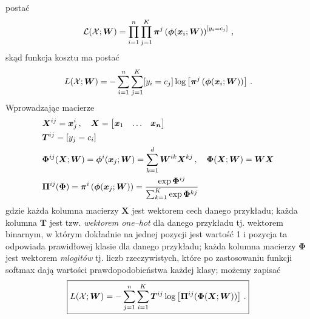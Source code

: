 \documentclass{myclass}
\numberwithin{equation}{subsection}
\begin{document}
postać
\begin{equation}
    \mathcal{L}(\mathcal{X}; \bm{W}) = \prod_{i=1}^n \prod_{j=1}^K \bm{\pi}^j\left(\bm{\phi}(\bm{x}_i; \bm{W})\right)^{[y_i = c_j]}\,,
\end{equation}
skąd funkcja kosztu ma postać
\begin{equation}
    L(\mathcal{X}; \bm{W}) = - \sum_{i=1}^n \sum_{j=1}^K [y_i = c_j] \log \left[ \bm{\pi}^j\left(\bm{\phi}(\bm{x}_i; \bm{W})\right)\right]\,.
\end{equation}
Wprowadzając macierze 
\begin{equation*}
    \begin{split}
        &\bm{X}^{ij} = \bm{x}_j^i\,,\quad \bm{X} = \mqty[\bm{x}_1 & \ldots & \bm{x_n}]\\
        &\bm{T}^{ij} = [y_j = c_i]\\
        &\bm{\Phi}^{ij}(\bm{X}; \bm{W}) = \bm{\phi}^i(\bm{x}_j;\bm{W}) = \sum_{k=1}^d \bm{W}^{ik}\bm{X}^{kj}\,,\quad \bm{\Phi}(\bm{X};\bm{W}) = \bm{W}\bm{X}\\
        &\bm{\Pi}^{ij}(\bm{\Phi}) = \bm{\pi}^i\left(\bm{\phi}(\bm{x}_j;\bm{W})\right) = \frac{\exp\bm{\Phi}^{ij}}{\sum_{k=1}^K \exp \bm{\Phi}^{kj}}
    \end{split}
\end{equation*}
gdzie każda kolumna macierzy \(\bm{X}\) jest wektorem cech danego przykładu; każda kolumna
\(\bm{T}\) jest tzw. \emph{wektorem one--hot} dla danego przykładu tj. wektorem binarnym, w którym
dokładnie na jednej pozycji jest wartość 1 i pozycja ta odpowiada prawidłowej klasie dla danego
przykładu; każda kolumna macierzy \(\bm{\Phi}\) jest wektorem \emph{mlogitów} tj. liczb
rzeczywistych, które po zastosowaniu funkcji softmax dają wartości prawdopodobieństwa każdej klasy;
możemy zapisać
\begin{equation}\boxed{
    L(\mathcal{X}; \bm{W}) = -\sum_{j=1}^n\sum_{i=1}^K \bm{T}^{ij} \log \left[ \bm{\Pi}^{ij}(\bm{\Phi}(\bm{X}; \bm{W})) \right]\,.
}\end{equation}
\end{document}
